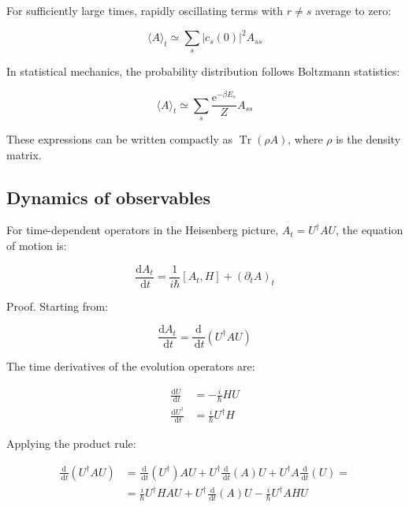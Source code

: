 \documentclass[italian]{HKNdocument}
\begin{document}
For sufficiently large times, rapidly oscillating terms with $r \neq s$ average to zero:

\begin{equation}
\langle A\rangle_{t} \simeq \sum_{s}\left|c_{s}(0)\right|^{2} A_{s s} \label{eq:10.36}
\end{equation}

In statistical mechanics, the probability distribution follows Boltzmann statistics:

\begin{equation}
\langle A\rangle_{t} \simeq \sum_{s} \frac{\mathrm{e}^{-\beta E_{s}}}{Z} A_{s s} \label{eq:10.37}
\end{equation}

These expressions can be written compactly as $\operatorname{Tr}(\rho A)$, where $\rho$ is the density matrix.

\subsection{Dynamics of observables}
For time-dependent operators in the Heisenberg picture, $A_t = U^\dagger A U$, the equation of motion is:

\begin{equation}
\frac{\mathrm{d} A_{t}}{\, \mathrm{d} t}=\frac{1}{i \hbar}\left[A_{t}, H\right]+\left(\partial_{t} A\right)_{t} \label{eq:10.38}
\end{equation}


Proof. Starting from:

\begin{equation}
\frac{\mathrm{d} A_{t}}{\, \mathrm{d} t}=\frac{\mathrm{d}}{\, \mathrm{d} t}\left(U^{\dagger} A U\right) \label{eq:10.39}
\end{equation}

The time derivatives of the evolution operators are:

\begin{align}
\frac{\mathrm{d} U}{\, \mathrm{d} t} & =-\frac{i}{\hbar} H U \\
\frac{\mathrm{d} U^{\dagger}}{\, \mathrm{d} t} & =\frac{i}{\hbar} U^{\dagger} H \label{eq:10.40}
\end{align}

Applying the product rule:

\begin{align}
\frac{\mathrm{d}}{\, \mathrm{d} t}\left(U^{\dagger} A U\right) & =\frac{\mathrm{d}}{\, \mathrm{d} t}\left(U^{\dagger}\right) A U+U^{\dagger} \frac{\mathrm{d}}{\, \mathrm{d} t}(A) U+U^{\dagger} A \frac{\, \mathrm{d}}{\, \mathrm{d} t}(U)=  \label{eq:10.41}\\
& =\frac{i}{\hbar} U^{\dagger} H A U+U^{\dagger} \frac{\, \mathrm{d}}{\, \mathrm{d} t}(A) U-\frac{i}{\hbar} U^{\dagger} A H U
\end{align}
\end{document}
